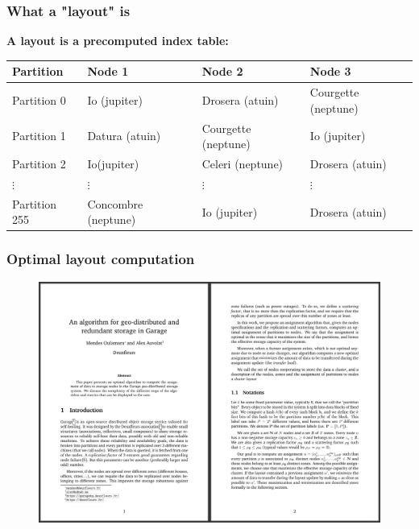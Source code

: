 \documentclass[aspectratio=169]{beamer}
\begin{document}
\begin{frame}
	\frametitle{What a "layout" is}
		\textbf{A layout is a precomputed index table:}
		\vspace{1em}

		{\footnotesize
			\begin{center}
			\begin{tabular}{|l|l|l|l|}
				\hline
				\textbf{Partition} & \textbf{Node 1} & \textbf{Node 2} & \textbf{Node 3} \\
				\hline
				\hline
				Partition 0 & Io (jupiter) & Drosera (atuin) & Courgette (neptune) \\
				\hline
				Partition 1 & Datura (atuin) & Courgette (neptune) & Io (jupiter) \\
				\hline
				Partition 2 & Io(jupiter) & Celeri (neptune) & Drosera (atuin) \\
				\hline
				\hspace{1em}$\vdots$ & \hspace{1em}$\vdots$ & \hspace{1em}$\vdots$ & \hspace{1em}$\vdots$ \\
				\hline
				Partition 255 & Concombre (neptune) & Io (jupiter) & Drosera (atuin) \\
				\hline
			\end{tabular}
			\end{center}
		}

	\vspace{2em}
\end{frame}

\begin{frame}
	\frametitle{Optimal layout computation}
	\begin{figure}
		\center
		\includegraphics[width=.6\linewidth]{../assets/geodistrib_paper.png}
	\end{figure}
\end{frame}
\end{document}
